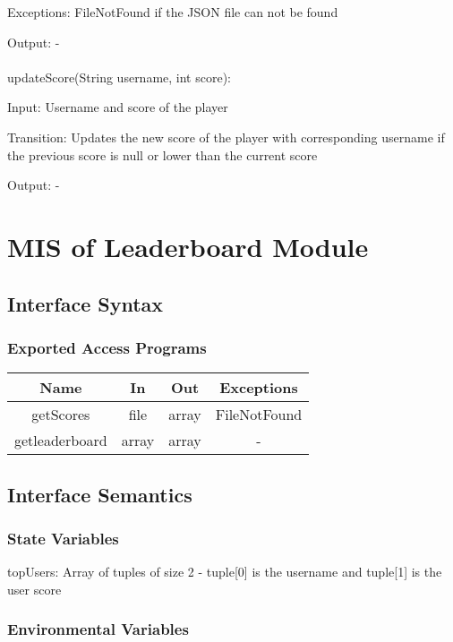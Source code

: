 \documentclass[12,english]{article}
\begin{document}
    	Exceptions: FileNotFound if the JSON file can not be found
    	
    	Output: -\\
		\\
		updateScore(String username, int score):
		
		Input: Username and score of the player

		Transition: Updates the new score of the player with corresponding username if the previous score is null or lower than the current score
		
		Output: - \\
		
\section{MIS of Leaderboard Module}
		\subsection{Interface Syntax}
		\subsubsection{Exported Access Programs}
		\begin{tabular}[pos]{|c|c|c|c|}
			
			\hline
			\textbf{Name}& \textbf{In} & \textbf{Out} & \textbf{Exceptions} \\ \hline
            getScores & file & array & FileNotFound\\ \hline
			getleaderboard & array & array & -\\ \hline
			
		\end{tabular}
		
		\subsection{Interface Semantics}
		\subsubsection{State Variables}
		
		topUsers: Array of tuples of size 2 - tuple[0] is the username and tuple[1] is the user score
		
		\subsubsection{Environmental Variables}
\end{document}
